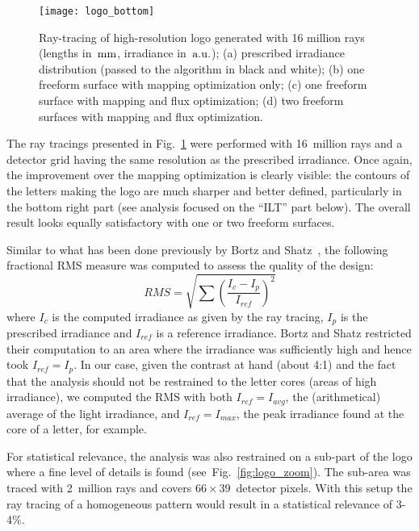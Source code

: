 \begin{figure}[!htbp]
  \centering \texttt{[image: logo\_bottom]}
  \caption{Ray-tracing of high-resolution logo generated with 16
    million rays (lengths in~$\rm mm$, irradiance in~$\rm a.u.$); (a)
    prescribed irradiance distribution (passed to the algorithm in
    black and white); (b) one freeform surface with mapping
    optimization only; (c) one freeform surface with mapping and flux
    optimization; (d) two freeform surfaces with mapping and flux
    optimization.}
  
  \label{fig:logo}
\end{figure}

The ray tracings presented in Fig.~\ref{fig:logo} were performed with
16~million rays and a detector grid having the same resolution as the
prescribed irradiance.  Once again, the improvement over the mapping
optimization is clearly visible: the contours of the letters making
the logo are much sharper and better defined, particularly in the
bottom right part (see analysis focused on the ``ILT'' part
below). The overall result looks equally satisfactory with one or two
freeform surfaces.

Similar to what has been done previously by Bortz and
Shatz~\cite{Bortz2007}, the following fractional RMS measure was
computed to assess the quality of the design:
\begin{equation}
  RMS= \sqrt{\sum\left(\frac{I_c - I_p}{I_{ref}}\right)^2}
  \label{eq:rms}
\end{equation} 
where $I_c$ is the computed irradiance as given by the ray tracing,
$I_p$ is the prescribed irradiance and $I_{ref}$ is a reference
irradiance.  Bortz and Shatz restricted their computation to an area
where the irradiance was sufficiently high and hence took
$I_{ref} = I_p$.  In our case, given the contrast at hand (about 4:1)
and the fact that the analysis should not be restrained to the letter
cores (areas of high irradiance), we computed the RMS with both
$I_{ref} = I_{avg}$, the (arithmetical) average of the light
irradiance, and $I_{ref} = I_{max}$, the peak irradiance found at the
core of a letter, for example.

For statistical relevance, the analysis was also restrained on a
sub-part of the logo where a fine level of details is found
(see~Fig.~\ref{fig:logo_zoom}).  The sub-area was traced with
2~million rays and covers $66\times39$~detector pixels.  With this
setup the ray tracing of a homogeneous pattern would result in a
statistical relevance of 3-4\%.

